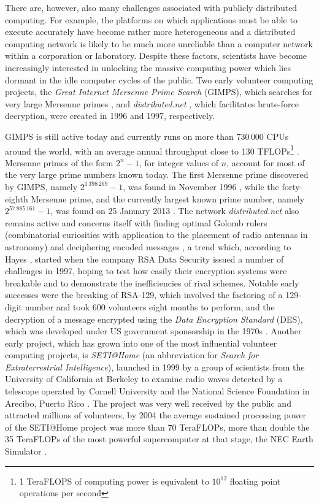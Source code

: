 There are, however, also many challenges associated with publicly distributed computing. For example, the platforms on which   applications must be able to execute accurately have become rather more heterogeneous  and a distributed computing   network is likely to be much more unreliable than  a computer network within a corporation or laboratory.   Despite these factors, scientists have become increasingly interested in unlocking   the massive computing power which   lies dormant in the idle computer cycles of the public. Two early volunteer computing projects, the \emph{Great Internet Mersenne Prime Search} (GIMPS), which searches for very large Mersenne primes \cite{gimps}, and \emph{distributed.net} \cite{distnet}, which facilitates brute-force decryption, were created in 1996 and 1997, respectively. 

GIMPS is still active today and currently runs on more than $730\,000$ CPUs around the world, with an average annual throughput close to  130 TFLOPs\footnote{1 TeraFLOPS of computing power is equivalent to $10^{12}$ floating point operations per second} \cite{gimps}. Mersenne primes of the form $2^n-1$, for integer  values of $n$, account for most of the very large prime numbers known today. The first Mersenne prime discovered by GIMPS, namely $2^{1\,398\,269}-1$, was found in November 1996 \cite{hayes}, while the  forty-eighth Mersenne prime, and the currently largest known prime number, namely $2^{57\,885\,161} -1$, was   found on 25 January 2013 \cite{gimps}. 
The network \emph{distributed.net} also remains active   and concerns itself with finding optimal Golomb rulers (combinatorial curiosities with application to the placement of radio antennas in astronomy) and deciphering encoded messages \cite{distnet}, a trend which, according to Hayes \cite{hayes}, started when the company RSA Data Security  issued a number of challenges in 1997, hoping to test how easily their encryption systems were breakable and to demonstrate the inefficiencies of rival schemes. Notable early successes were the breaking of RSA-129, which involved the factoring of a 129-digit number   and  took 600 volunteers eight months to perform, and the decryption of a message encrypted using the \emph{Data Encryption Standard} (DES), which was developed under US government sponsorship in the 1970s \cite{distnet}. 
Another early project, which has grown into one of the most influential volunteer computing projects, is  \emph{SETI@Home} (an abbreviation for \emph{Search for Extraterrestrial Intelligence}), launched  in 1999 by a group of scientists from the University of California at Berkeley to examine radio waves detected by a telescope operated by Cornell University and the National Science Foundation in Arecibo, Puerto Rico \cite{anderson:seti2002}. The project was very well received by the public and attracted millions of volunteers, by 2004 the average sustained processing power of the SETI@Home project was more than 70 TeraFLOPs, more than double the 35 TeraFLOPs of the most powerful supercomputer at that stage, the NEC Earth Simulator \cite{anderson2004boinc}.
 
